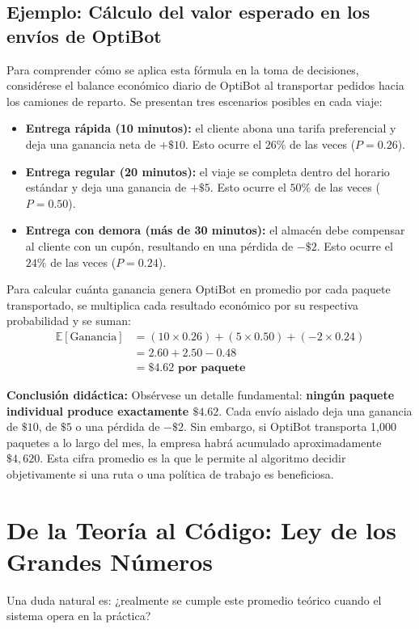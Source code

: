 \subsection*{Ejemplo: Cálculo del valor esperado en los envíos de OptiBot}
Para comprender cómo se aplica esta fórmula en la toma de decisiones, considérese el balance económico diario de OptiBot al transportar pedidos hacia los camiones de reparto. Se presentan tres escenarios posibles en cada viaje:
\begin{itemize}
  \item \textbf{Entrega rápida (10 minutos):} el cliente abona una tarifa preferencial y deja una ganancia neta de $+\$10$. Esto ocurre el $26\%$ de las veces ($P = 0.26$).
  \item \textbf{Entrega regular (20 minutos):} el viaje se completa dentro del horario estándar y deja una ganancia de $+\$5$. Esto ocurre el $50\%$ de las veces ($P = 0.50$).
  \item \textbf{Entrega con demora (más de 30 minutos):} el almacén debe compensar al cliente con un cupón, resultando en una pérdida de $-\$2$. Esto ocurre el $24\%$ de las veces ($P = 0.24$).
\end{itemize}

Para calcular cuánta ganancia genera OptiBot en promedio por cada paquete transportado, se multiplica cada resultado económico por su respectiva probabilidad y se suman:
\begin{align*}
  \mathbb{E}[\text{Ganancia}] &= (10 \times 0.26) + (5 \times 0.50) + (-2 \times 0.24) \\
  &= 2.60 + 2.50 - 0.48 \\
  &= \mathbf{\$4.62 \text{ por paquete}}
\end{align*}

\textbf{Conclusión didáctica:} Obsérvese un detalle fundamental: \textbf{ningún paquete individual produce exactamente $\$4.62$}. Cada envío aislado deja una ganancia de $\$10$, de $\$5$ o una pérdida de $-\$2$. Sin embargo, si OptiBot transporta 1,000 paquetes a lo largo del mes, la empresa habrá acumulado aproximadamente $\$4,620$. Esta cifra promedio es la que le permite al algoritmo decidir objetivamente si una ruta o una política de trabajo es beneficiosa.

\section{De la Teoría al Código: Ley de los Grandes Números}
Una duda natural es: ¿realmente se cumple este promedio teórico cuando el sistema opera en la práctica?

